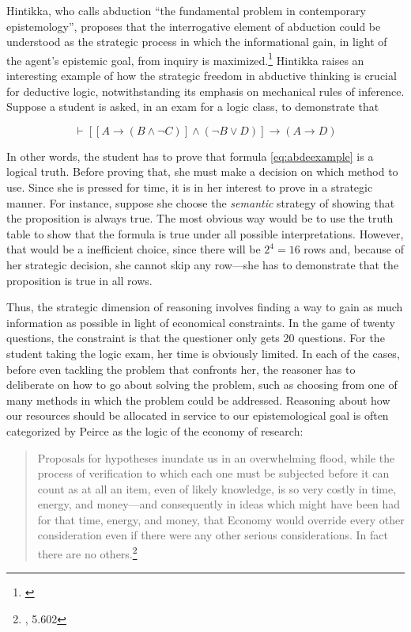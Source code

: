 Hintikka, who calls abduction ``the fundamental problem in contemporary epistemology'', proposes that the interrogative element of abduction could be understood as the strategic process in which the informational gain, in light of the agent's epistemic goal, from inquiry is maximized.\footnote{\cite{hintikka}} Hintikka raises an interesting example of how the strategic freedom in abductive thinking is crucial for deductive logic, notwithstanding its emphasis on mechanical rules of inference. Suppose a student is asked, in an exam for a logic class, to demonstrate that

\begin{equation}
	\vdash [[A\to(B\wedge \neg C)] \wedge (\neg B \vee D) ]\to (A\to D)
	\label{eq:abdeexample}
\end{equation}

 
 
 In other words, the student has to prove that formula \ref{eq:abdeexample} is a logical truth. Before proving that, she must make a decision on which method to use. Since she is pressed for time, it is in her interest to prove in a strategic manner. For instance, suppose she choose the \emph{semantic} strategy of showing that the proposition is  always true. The most obvious way would be to use the truth table to show that the formula is true under all possible interpretations. However, that would be a inefficient choice, since there will be $2^4=16$ rows and, because of her strategic decision, she cannot skip any row---she has to demonstrate that the proposition is true in all rows. 


Thus, the strategic dimension of reasoning involves finding a way to gain as much information as possible in light of economical constraints. In the game of twenty questions, the constraint is that the questioner only gets 20 questions. For the student taking the logic exam, her time is obviously limited. In each of the cases, before even tackling the problem that confronts her, the reasoner has to deliberate on how to go about solving the problem, such as choosing from one of many methods in which the problem could be addressed. Reasoning about how our resources should be allocated in service to our epistemological goal is often categorized by Peirce as the logic of the economy of research:

\begin{quote}
Proposals for hypotheses inundate us in an overwhelming flood, while the process of verification to which each one must be subjected before it can count as at all an item, even of likely knowledge, is so very costly in time, energy, and money---and consequently in ideas which might have been had for that time, energy, and money, that Economy would override every other consideration even if there were any other serious considerations. In fact there are no others.\footnote{\cite{CP}, 5.602}	
\end{quote}

